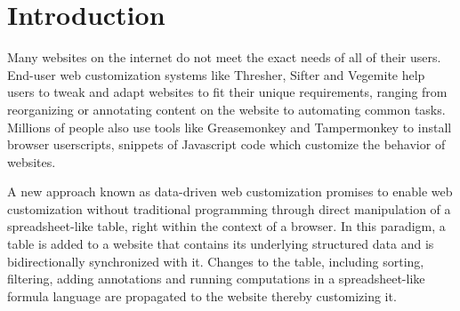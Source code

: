 \documentclass[sigconf,10pt]{acmart}
\begin{document}



\maketitle

\hypertarget{sec:introduction}{%
\section{Introduction}\label{sec:introduction}}

Many websites on the internet do not meet the exact needs of all of
their users. End-user web customization systems like Thresher, Sifter
and Vegemite help users to tweak and adapt websites to fit their unique
requirements, ranging from reorganizing or annotating content on the
website to automating common tasks. Millions of people also use tools
like Greasemonkey and Tampermonkey to install browser userscripts,
snippets of Javascript code which customize the behavior of websites.

A new approach known as data-driven web customization promises to enable
web customization without traditional programming through direct
manipulation of a spreadsheet-like table, right within the context of a
browser. In this paradigm, a table is added to a website that contains
its underlying structured data and is bidirectionally synchronized with
it. Changes to the table, including sorting, filtering, adding
annotations and running computations in a spreadsheet-like formula
language are propagated to the website thereby customizing it.
\end{document}
